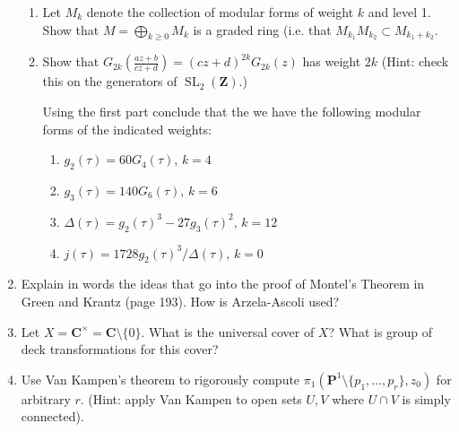 \documentclass[a4paper,10pt]{article}
\newcommand{\ZZ}{\mathbf{Z}}
\newcommand{\CC}{\mathbf{C}}
\newcommand{\SL}{\operatorname{SL}}
\begin{document}
\begin{enumerate}
\begin{enumerate}
\item Let $M_k$ denote the collection of modular forms of weight $k$ and level 1. 
Show that $M = \bigoplus_{k\geq 0} M_k$ is a graded ring (i.e. that $M_{k_1}M_{k_2} \subset M_{k_1+k_2}$. 

\item Show that $G_{2k}(\frac{az+b}{cz+d}) = (cz + d)^{2k} G_{2k}(z)$ has weight $2k$ (Hint: check this on the generators of $\SL_2(\ZZ)$.)

Using the first part conclude that the we have the following modular forms of the indicated weights:
\begin{enumerate}
\item $g_2(\tau) = 60 G_4(\tau)$, $k=4$
\item $g_3(\tau) = 140 G_6(\tau)$, $k=6$
\item $\Delta(\tau) = g_2(\tau)^3 - 27 g_3(\tau)^2$, $k=12$
\item $j(\tau) = 1728 g_2(\tau)^3/\Delta(\tau)$, $k=0$
\end{enumerate}
\end{enumerate}

\item Explain in words the ideas that go into the proof of Montel's Theorem in Green and Krantz (page 193). 
How is Arzela-Ascoli used?

\item Let $X=\CC^{\times} = \CC \setminus \lbrace 0 \rbrace$. 
What is the universal cover of $X$? What is group of deck transformations for this cover? 


\item Use Van Kampen's theorem to rigorously compute 
 $\pi_1(\mathbf{P}^1\setminus \lbrace p_1,\ldots, p_r\rbrace, z_0)$ for arbitrary $r$. (Hint: apply Van Kampen to open sets $U,V$ where $U\cap V$ is simply connected). 

\end{enumerate}
\end{document}
